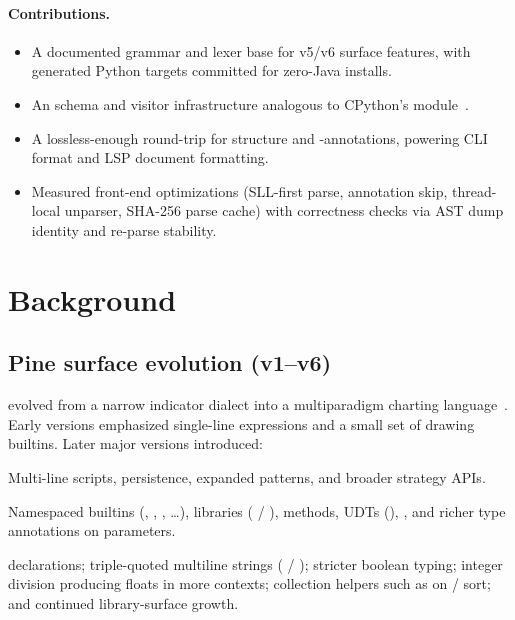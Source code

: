 \documentclass[11pt,a4paper]{article}
\begin{document}
\paragraph{Contributions.}
\begin{itemize}[leftmargin=*]
  \item A documented \antlr{} grammar and lexer base for \pine{} v5/v6 surface
    features, with generated Python targets committed for zero-Java installs.
  \item An \asdl{} schema and visitor infrastructure analogous to CPython's
     module~\citep{asdl-python,wang1997asdl}.
  \item A lossless-enough round-trip for structure and -annotations,
    powering CLI format and LSP document formatting.
  \item Measured front-end optimizations (SLL-first parse, annotation skip,
    thread-local unparser, SHA-256 parse cache) with correctness checks via
    AST dump identity and re-parse stability.
\end{itemize}

\section{Background}
\label{sec:background}

\subsection{Pine surface evolution (v1--v6)}
\label{sec:pine-evolution}

\pine{} evolved from a narrow indicator dialect into a multiparadigm charting
language~\citep{tradingview-pine}. Early versions emphasized single-line
expressions and a small set of drawing builtins. Later major versions introduced:

\begin{description}[style=nextline,leftmargin=1.2em]
  \item[v3--v4]
    Multi-line scripts,  persistence, expanded 
    patterns, and broader strategy APIs.
  \item[v5]
    Namespaced builtins (, , , \ldots),
    libraries ( / ), methods, UDTs (),
    , and richer type annotations on parameters.
  \item[v6]
     declarations; triple-quoted multiline strings
    ( / ); stricter boolean typing;
    integer division producing floats in more contexts; collection helpers such
    as  on / sort; and continued
    library-surface growth.
\end{description}
\end{document}
